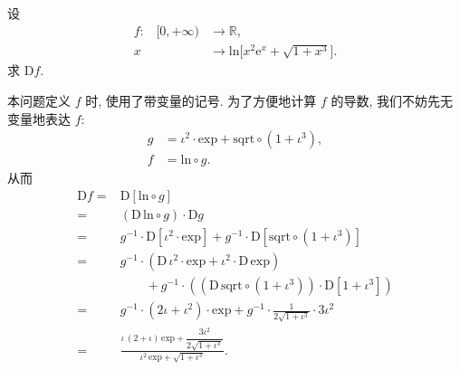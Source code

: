 \begin{example}
    设
    \begin{align*}
        \text{$f$:} \quad
        [0, +\infty) & \to \mathbb{R},                                                    \\
        x            & \to \mathrm{ln} \Bigg[ x^2 \mathrm{e}^{x} + \sqrt{1 + x^3} \Bigg].
    \end{align*}
    求 $\mathrm{D}f$.

    本问题定义 $f$ 时, 使用了带变量的记号.
    为了方便地计算 $f$ 的导数, 我们不妨先无变量地表达 $f$:
    \begin{align*}
        g & = \iota^2 \cdot \mathrm{exp} + \mathrm{sqrt} \circ (1 + \iota^3), \\
        f & = \mathrm{ln} \circ g.
    \end{align*}
    从而
    \begin{align*}
        \mathrm{D}f
        = {} & \mathrm{D}[\mathrm{ln} \circ g]                                        \\
        = {} & (\mathrm{D}\,\mathrm{ln} \circ g) \cdot \mathrm{D}g                    \\
        = {} & g^{-1} \cdot \mathrm{D}[\iota^2 \cdot \mathrm{exp}]
        + g^{-1} \cdot \mathrm{D}[\mathrm{sqrt} \circ (1 + \iota^3)]                  \\
        = {} & g^{-1} \cdot (\mathrm{D}\,\iota^2 \cdot \mathrm{exp}
        + \iota^2 \cdot \mathrm{D}\,\mathrm{exp})                                     \\
             & \qquad + g^{-1} \cdot ((\mathrm{D}\,\mathrm{sqrt} \circ (1 + \iota^3))
        \cdot \mathrm{D}[1 + \iota^3])                                                \\
        = {} & g^{-1} \cdot (2\iota + \iota^2) \cdot \mathrm{exp}
        + g^{-1} \cdot \frac{1}{2\sqrt{1 + \iota^3}} \cdot 3\iota^2                   \\
        = {} & \frac{\iota\,(2 + \iota)\,\mathrm{exp}
            + \dfrac{3\iota^2}{2\sqrt{1 + \iota^3}}}
        {\iota^2 \,\mathrm{exp} + \sqrt{1 + \iota^3}}.
    \end{align*}
\end{example}
